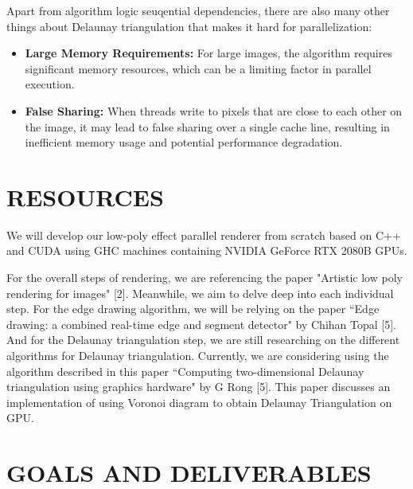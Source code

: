 \documentclass[12pt]{article}
\theoremstyle{definition}
\theoremstyle{plain}
\begin{document}
Apart from algorithm logic seuqential dependencies, there are also many other things
about Delaunay triangulation that makes it hard for parallelization:
\begin{itemize}
\item {\bf Large Memory Requirements:} For large images, the algorithm requires significant memory resources, which can be a limiting factor in parallel execution.
\item {\bf False Sharing:} When threads write to pixels that are close to each other on the image, it may lead to false sharing over a single cache line, resulting in inefficient memory usage and potential performance degradation.
\end{itemize}



\section{RESOURCES}
We will develop our low-poly effect parallel renderer from scratch based on C++
and CUDA using GHC machines containing NVIDIA GeForce RTX 2080B GPUs.

For the overall steps of rendering, we are referencing the paper 
"Artistic low poly rendering for images" [2]. 
Meanwhile, we aim to delve deep into each individual step. 
For the edge drawing algorithm, we will be relying on the paper 
``Edge drawing: a combined real-time edge and segment detector" by Chihan Topal [5]. 
And for the Delaunay triangulation step, we are still researching on the different 
algorithms for Delaunay triangulation. Currently, we are considering using the
algorithm described in this paper ``Computing two-dimensional Delaunay triangulation
using graphics hardware" by G Rong [5]. This paper discusses an implementation of 
using Voronoi diagram to obtain Delaunay Triangulation on GPU.





\section{GOALS AND DELIVERABLES}
\end{document}
